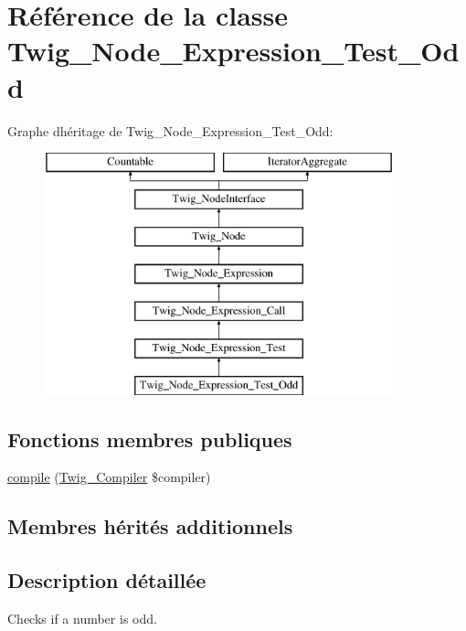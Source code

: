 \hypertarget{class_twig___node___expression___test___odd}{}\section{Référence de la classe Twig\+\_\+\+Node\+\_\+\+Expression\+\_\+\+Test\+\_\+\+Odd}
\label{class_twig___node___expression___test___odd}
Graphe d\textquotesingle{}héritage de Twig\+\_\+\+Node\+\_\+\+Expression\+\_\+\+Test\+\_\+\+Odd\+:\begin{figure}[H]
\begin{center}
\leavevmode
\includegraphics[height=7.000000cm]{class_twig___node___expression___test___odd}
\end{center}
\end{figure}
\subsection*{Fonctions membres publiques}
\begin{DoxyCompactItemize}
\item 
\hyperlink{class_twig___node___expression___test___odd_a4e0faa87c3fae583620b84d3607085da}{compile} (\hyperlink{class_twig___compiler}{Twig\+\_\+\+Compiler} \$compiler)
\end{DoxyCompactItemize}
\subsection*{Membres hérités additionnels}


\subsection{Description détaillée}
Checks if a number is odd.


